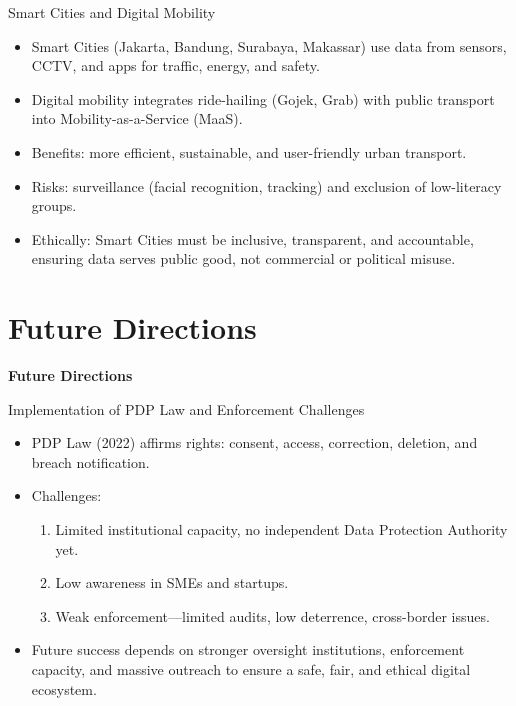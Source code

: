 \documentclass[aspectratio=169, table]{beamer}
\begin{document}
\begin{frame}{Smart Cities and Digital Mobility}
	\vspace{20pt}
	\begin{itemize}
		\item Smart Cities (Jakarta, Bandung, Surabaya, Makassar) use data from sensors, CCTV, and apps for traffic, energy, and safety.  
		\item Digital mobility integrates ride-hailing (Gojek, Grab) with public transport into Mobility-as-a-Service (MaaS).  
		\item Benefits: more efficient, sustainable, and user-friendly urban transport.  
		\item Risks: surveillance (facial recognition, tracking) and exclusion of low-literacy groups.  
		\item Ethically: Smart Cities must be inclusive, transparent, and accountable, ensuring data serves public good, not commercial or political misuse.  
	\end{itemize}
\end{frame}


\section{Future Directions}

\begin{frame}{\hfill}
	\centering
	\Huge{\textbf{Future Directions}}
\end{frame}

\begin{frame}{\Large{Implementation of PDP Law and Enforcement Challenges}}
	\vspace{20pt}
	\begin{itemize}
		\item PDP Law (2022) affirms rights: consent, access, correction, deletion, and breach notification.  
		\item Challenges:  
		\begin{enumerate}
			\item Limited institutional capacity, no independent Data Protection Authority yet.  
			\item Low awareness in SMEs and startups.  
			\item Weak enforcement—limited audits, low deterrence, cross-border issues.  
		\end{enumerate}
		\item Future success depends on stronger oversight institutions, enforcement capacity, and massive outreach to ensure a safe, fair, and ethical digital ecosystem.  
	\end{itemize}
\end{frame}
\end{document}
